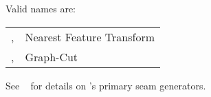 \begin{codelist}
  Valid  names are:

  \begin{center}
    \begin{tabular}{p{.45\linewidth}l}
      \code{nearest-feature-transform}, \code{nft}\genidx{nearest
        feature transform (\acronym{NFT})} & Nearest Feature Transform \\
    \code{graph-cut}, \code{gc}\genidx{graph-cut (\acronym{GC})} &
    Graph-Cut
    \end{tabular}
  \end{center}

  See \chapterName~ for details on \App's primary seam generators.
\end{codelist}



